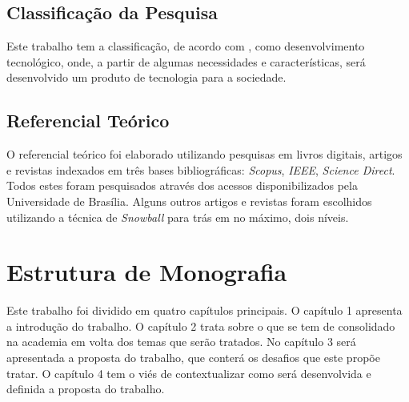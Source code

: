 \subsection{Classificação da Pesquisa}
\label{sub:classifica_o_da_pesquisa}
Este trabalho tem a classificação, de acordo com \cite{gil2010metodos}, como desenvolvimento tecnológico,
onde, a partir de algumas necessidades e características, será desenvolvido um produto
de tecnologia para a sociedade.

\subsection{Referencial Teórico}
\label{sub:referencial_te_rico}
O referencial teórico foi elaborado utilizando pesquisas em livros digitais, artigos e
revistas indexados em três bases bibliográficas: \textit{Scopus}, \textit{IEEE}, \textit{Science Direct}. Todos estes
foram pesquisados através dos acessos disponibilizados pela Universidade de Brasília.
Alguns outros artigos e revistas foram escolhidos utilizando a técnica de
\textit{Snowball} para trás em no máximo, dois níveis.


\section{Estrutura de Monografia}
Este trabalho foi dividido em quatro capítulos principais. O capítulo 1 apresenta a introdução
do trabalho. O capítulo 2 trata sobre o que se tem de consolidado na academia em volta
dos temas que serão tratados. No capítulo 3 será apresentada a proposta do trabalho, que conterá
os desafios que este propõe tratar. O capítulo 4 tem o viés de contextualizar como será
desenvolvida e definida a proposta do trabalho.
